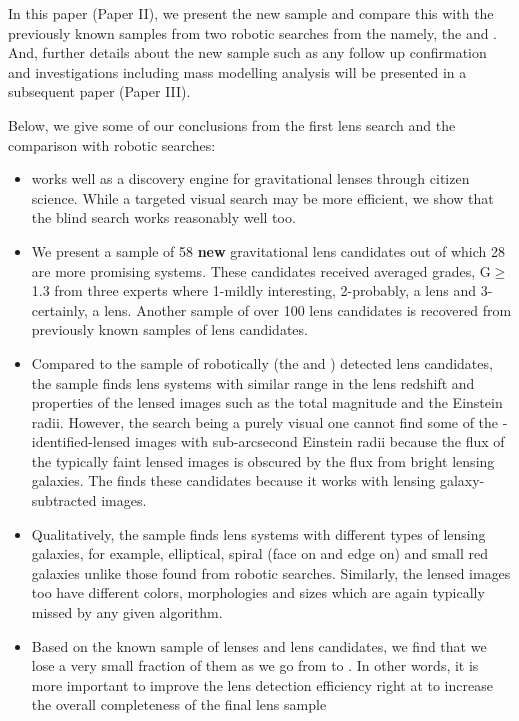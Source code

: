 \documentclass[useAMS,usenatbib,a4paper]{mn2e}
\begin{document}
In this paper (Paper II), we present the new \sw sample and compare this
with the previously known samples from two robotic searches from the
\cfhtls namely, the \rf and \af. And, further details about the new
sample such as any follow up confirmation and investigations including
mass modelling analysis will be presented in a subsequent \sw paper
(Paper III). 

Below, we give some of our conclusions from the first \sw lens search
and the comparison with robotic searches:
\begin{itemize}

\item \sw works well as a discovery engine for gravitational lenses
through citizen science. While a targeted visual search may be more
efficient, we show that the blind search works reasonably well too.

\item We present a sample of 58 {\bf new} gravitational lens candidates
out of which 28 are more promising systems. These candidates received
averaged grades, G$\ge$1.3 from three experts where 1-mildly interesting,
2-probably, a lens and 3-certainly, a lens. Another sample of over 100
lens candidates is recovered from previously known samples of lens
candidates.

\item Compared to the sample of robotically (the \rf and \af) detected
lens candidates, the \sw sample finds lens systems with similar range in
the lens redshift and properties of the lensed images such as the total
magnitude and the Einstein radii. However, the \sw search being a purely
visual one cannot find some of the \rf-identified-lensed images with
sub-arcsecond Einstein radii because the flux of the typically faint
lensed images is obscured by the flux from bright lensing galaxies. The
\rf finds these candidates because it works with lensing
galaxy-subtracted images.

\item Qualitatively, the \sw sample finds lens systems with different
types of lensing galaxies, for example, elliptical, spiral (face on and
edge on) and small red galaxies unlike those found from robotic
searches. Similarly, the lensed images too have different colors,
morphologies and sizes which are again typically missed by any given
algorithm.

\item Based on the known sample of lenses and lens candidates, we find
that we lose a very small fraction of them as we go from \StageOne to
\StageTwo. In other words, it is more important to improve the lens
detection efficiency right at \StageOne to increase the overall
completeness of the final lens sample


\end{itemize}
\end{document}
